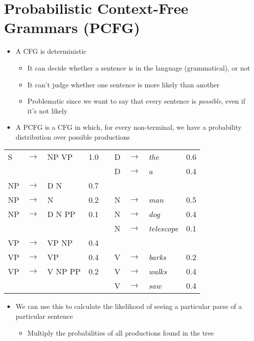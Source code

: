 \documentclass[11pt,letterpaper]{article}
\newcommand{\ra}{\rightarrow}
\begin{document}
\section{Probabilistic Context-Free Grammars (PCFG)}

\begin{itemize}
  \item A CFG is deterministic
	\begin{itemize}
	  \item It can decide whether a sentence is in the language (grammatical), or not
	  \item It can't judge whether one sentence is more likely than another
	  \item Problematic since we want to say that every sentence is \textit{possible}, even if it's not likely
	\end{itemize}
  \item A PCFG is a CFG in which, for every non-terminal, we have a probability distribution over possible productions
\end{itemize}

	\begin{center}
	\begin{tabular}{llll p{18mm} llll}
	  S  & $\ra$ & NP VP    &  1.0  &&  D & $\ra$ & \textit{the}        & 0.6 \\
	     &       &          &       &&  D & $\ra$ & \textit{a}          & 0.4 \\
	  NP & $\ra$ & D N      &  0.7  &&    &       &                     &     \\
	  NP & $\ra$ & N        &  0.2  &&  N & $\ra$ & \textit{man}        & 0.5 \\
	  NP & $\ra$ & D N PP   &  0.1  &&  N & $\ra$ & \textit{dog}        & 0.4 \\
	     &       &          &       &&  N & $\ra$ & \textit{telescope}  & 0.1 \\
	  VP & $\ra$ & VP NP    &  0.4  &&    &       &                     &     \\
	  VP & $\ra$ & VP       &  0.4  &&  V & $\ra$ & \textit{barks}      & 0.2 \\
	  VP & $\ra$ & V NP PP  &  0.2  &&  V & $\ra$ & \textit{walks}      & 0.4 \\
	     &       &          &       &&  V & $\ra$ & \textit{saw}        & 0.4
	\end{tabular}
	\end{center}

\begin{itemize}
  \item We can use this to calculate the likelihood of seeing a particular parse of a particular sentence
	\begin{itemize}
	  \item Multiply the probabilities of all productions found in the tree
	\end{itemize}
\end{itemize}
\end{document}
